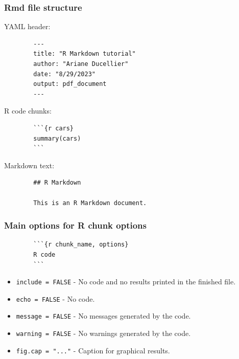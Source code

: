 \documentclass{beamer}
\begin{document}
	\begin{frame}[fragile]
		\frametitle{Rmd file structure}

		YAML header:

		\begin{exampleblock}{}
		\begin{BVerbatim}
		---
		title: "R Markdown tutorial"
		author: "Ariane Ducellier"
		date: "8/29/2023"
		output: pdf_document
		---
		\end{BVerbatim}
		\end{exampleblock}{}

		R code chunks:
		
		\begin{exampleblock}{}
		\begin{BVerbatim}
		```{r cars}
		summary(cars)
		```
		\end{BVerbatim}
		\end{exampleblock}{}

		Markdown text:

		\begin{exampleblock}{}
		\begin{BVerbatim}
		## R Markdown

		This is an R Markdown document.
		\end{BVerbatim}
		\end{exampleblock}{}

	\end{frame}

	\begin{frame}[fragile]
		\frametitle{Main options for R chunk options}

		\begin{exampleblock}{}
		\begin{BVerbatim}
		```{r chunk_name, options}
		R code
		```
		\end{BVerbatim}
		\end{exampleblock}{}

		\vspace{1em}

		\begin{itemize}
			\item \verb|include = FALSE| - No code and no results printed in the finished file.
			\item \verb|echo = FALSE| - No code.
			\item \verb|message = FALSE| - No messages generated by the code.
			\item \verb|warning = FALSE| - No warnings generated by the code.
			\item \verb|fig.cap = "..."| - Caption for graphical results.
		\end{itemize}

	\end{frame}
\end{document}
